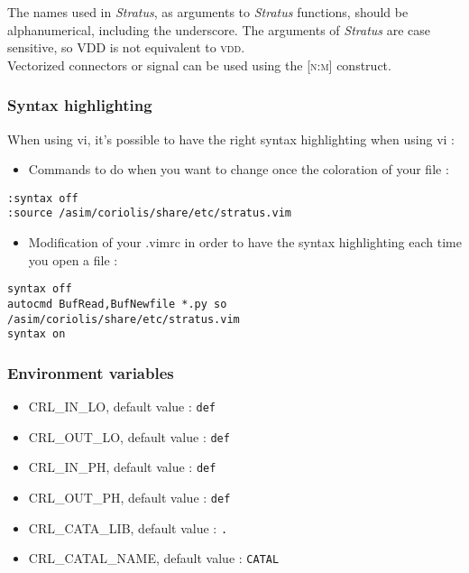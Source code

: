 \indent The names used in \emph{Stratus}, as arguments to \emph{Stratus} functions, should be alphanumerical, including the underscore. The arguments of \emph{Stratus} are case sensitive, so \textsc{VDD} is not equivalent to \textsc{vdd}.\\
    
\indent Vectorized connectors or signal can be used using the \textsc{[n:m]} construct.\\

\subsubsection{Syntax highlighting}

When using vi, it's possible to have the right syntax highlighting when using vi :

\begin{itemize}
    \item Commands to do when you want to change once the coloration of your file :
\end{itemize}
\begin{small}
\begin{verbatim}
:syntax off
:source /asim/coriolis/share/etc/stratus.vim
\end{verbatim}
\end{small}
\begin{itemize}
    \item Modification of your .vimrc in order to have the syntax highlighting each time you open a file :
\end{itemize}
\begin{small}
\begin{verbatim}
syntax off
autocmd BufRead,BufNewfile *.py so /asim/coriolis/share/etc/stratus.vim
syntax on
\end{verbatim}
\end{small}
        
\subsubsection{Environment variables}

\begin{itemize}
    \item CRL\_IN\_LO, default value : \verb-def-
    \item CRL\_OUT\_LO, default value : \verb-def-
    \item CRL\_IN\_PH, default value : \verb-def-
    \item CRL\_OUT\_PH, default value : \verb-def-
    \item CRL\_CATA\_LIB, default value : \verb-.-
    \item CRL\_CATAL\_NAME, default value : \verb-CATAL-
\end{itemize}

